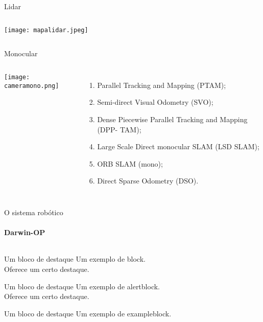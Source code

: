 \begin{frame}[t]{Lidar}
    \transboxout[duration=0.5]
    \begin{columns}
            \texttt{[image: mapalidar.jpeg]}
    \end{columns}
\end{frame}
\begin{frame}[t]{Monocular}
    \transboxout[duration=0.5]
    \begin{columns}
            \texttt{[image: cameramono.png]}
            \begin{enumerate}
                \item Parallel Tracking and Mapping (PTAM);
                \item Semi-direct Visual Odometry (SVO);
                \item Dense Piecewise Parallel Tracking and Mapping (DPP-
                        TAM);
                \item Large Scale Direct monocular SLAM (LSD SLAM);
                \item ORB SLAM (mono);
                \item Direct Sparse Odometry (DSO).
            \end{enumerate}
    \end{columns}
\end{frame}
\begin{frame}[t]{O sistema robótico}
    \transboxout[duration=0.5]
    \framesubtitle{Darwin-OP}
    \begin{columns}
    \end{columns}

    \begin{block}{Um bloco de destaque}
        Um exemplo de block.\\
        Oferece um certo destaque.
    \end{block}

    \begin{alertblock}{Um bloco de destaque}
        Um exemplo de alertblock.\\
        Oferece um certo destaque.
    \end{alertblock}

    \begin{exampleblock}{Um bloco de destaque}
        Um exemplo de exampleblock.
    \end{exampleblock}
\end{frame}

